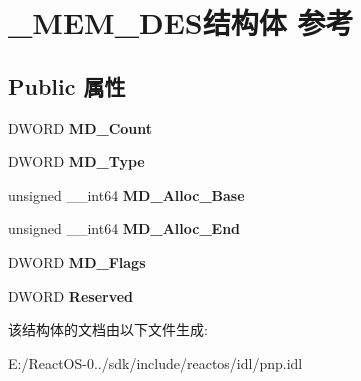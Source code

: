 \hypertarget{struct___m_e_m___d_e_s}{}\section{\+\_\+\+M\+E\+M\+\_\+\+D\+E\+S结构体 参考}
\label{struct___m_e_m___d_e_s}
\subsection*{Public 属性}
\begin{DoxyCompactItemize}
\item 
\mbox{\label{struct___m_e_m___d_e_s_a693c66e438c03cce7c4b52b404413867}} 
D\+W\+O\+RD {\bfseries M\+D\+\_\+\+Count}
\item 
\mbox{\label{struct___m_e_m___d_e_s_a56b244527103c5051b35e881668d9386}} 
D\+W\+O\+RD {\bfseries M\+D\+\_\+\+Type}
\item 
\mbox{\label{struct___m_e_m___d_e_s_a619c1875e51fcbc180b98fa0ed6c46ad}} 
unsigned \+\_\+\+\_\+int64 {\bfseries M\+D\+\_\+\+Alloc\+\_\+\+Base}
\item 
\mbox{\label{struct___m_e_m___d_e_s_a877cdcacd38490d2f9c2f295fe864df8}} 
unsigned \+\_\+\+\_\+int64 {\bfseries M\+D\+\_\+\+Alloc\+\_\+\+End}
\item 
\mbox{\label{struct___m_e_m___d_e_s_ae57616dd9e9ebabc4ac3a183bb6499f0}} 
D\+W\+O\+RD {\bfseries M\+D\+\_\+\+Flags}
\item 
\mbox{\label{struct___m_e_m___d_e_s_a0b08e0ba050ece11f2c9974bf45f9e72}} 
D\+W\+O\+RD {\bfseries Reserved}
\end{DoxyCompactItemize}


该结构体的文档由以下文件生成\+:\begin{DoxyCompactItemize}
\item 
E\+:/\+React\+O\+S-\/0../sdk/include/reactos/idl/pnp.\+idl\end{DoxyCompactItemize}
